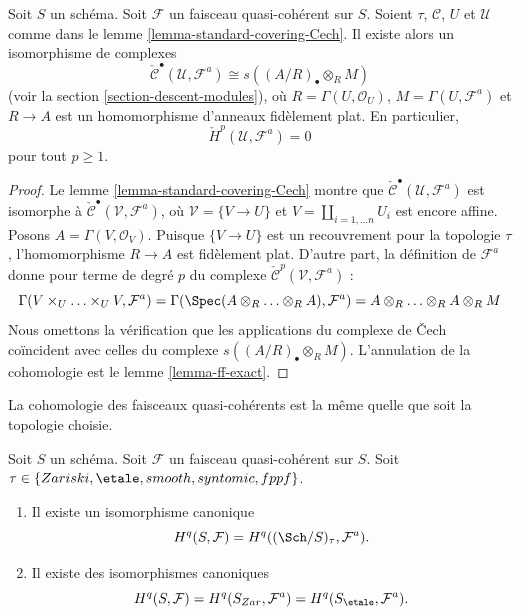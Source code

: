 \begin{lemma}
\label{lemma-standard-covering-Cech-quasi-coherent}
Soit $S$ un schéma. Soit $\mathcal{F}$ un faisceau quasi-cohérent sur
$S$. Soient $\tau$, $\mathcal{C}$, $U$ et $\mathcal{U}$ comme dans le
lemme \ref{lemma-standard-covering-Cech}. Il existe alors un isomorphisme
de complexes
$$
\check{\mathcal{C}}^\bullet(\mathcal{U}, \mathcal{F}^a)
\cong
s((A/R)_\bullet \otimes_R M)
$$
(voir la section \ref{section-descent-modules}), où
$R = \Gamma(U, \mathcal{O}_U)$, $M = \Gamma(U, \mathcal{F}^a)$ et
$R \to A$ est un homomorphisme d'anneaux fidèlement plat. En particulier,
$$
\check{H}^p(\mathcal{U}, \mathcal{F}^a) = 0
$$
pour tout $p \geq 1$.
\end{lemma}

\begin{proof}
Le lemme \ref{lemma-standard-covering-Cech} montre que
$\check{\mathcal{C}}^\bullet(\mathcal{U}, \mathcal{F}^a)$ est isomorphe
à $\check{\mathcal{C}}^\bullet(\mathcal{V}, \mathcal{F}^a)$, où
$\mathcal{V} = \{V \to U\}$ et
$V = \coprod_{i = 1, \ldots n} U_i$ est encore affine. Posons
$A = \Gamma(V, \mathcal{O}_V)$. Puisque $\{V \to U\}$ est un
recouvrement pour la topologie $\tau$, l'homomorphisme $R \to A$ est fidèlement plat.
D'autre part, la définition de $\mathcal{F}^a$ donne pour terme de degré
$p$ du complexe $\check{\mathcal{C}}^p(\mathcal{V}, \mathcal{F}^a)$ :
$$
\Gamma(V \times_U \ldots \times_U V, \mathcal{F}^a)
=
\Gamma(\Spec(A \otimes_R \ldots \otimes_R A), \mathcal{F}^a)
=
A \otimes_R \ldots \otimes_R A \otimes_R M
$$
Nous omettons la vérification que les applications du complexe de
{\v C}ech coïncident avec celles du complexe
$s((A/R)_\bullet \otimes_R M)$. L'annulation de la cohomologie est le
lemme \ref{lemma-ff-exact}.
\end{proof}

\begin{proposition}
\label{proposition-same-cohomology-quasi-coherent}
\begin{slogan}
La cohomologie des faisceaux quasi-cohérents est la même quelle que soit
la topologie choisie.
\end{slogan}
Soit $S$ un schéma. Soit $\mathcal{F}$ un faisceau quasi-cohérent sur
$S$. Soit $\tau \in \{Zariski, \linebreak[0] \etale, \linebreak[0]
smooth, \linebreak[0] syntomic, \linebreak[0] fppf\}$.
\begin{enumerate}
\item Il existe un isomorphisme canonique
$$
H^q(S, \mathcal{F}) = H^q((\Sch/S)_\tau, \mathcal{F}^a).
$$
\item Il existe des isomorphismes canoniques
$$
H^q(S, \mathcal{F}) =
H^q(S_{Zar}, \mathcal{F}^a) =
H^q(S_\etale, \mathcal{F}^a).
$$
\end{enumerate}
\end{proposition}

